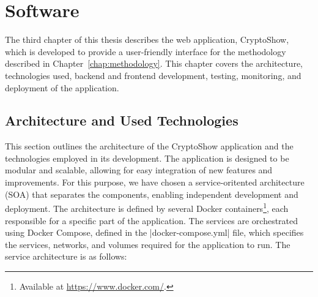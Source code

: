 \chapter{Software}
\label{chap:software}

The third chapter of this thesis describes the web application, CryptoShow, which is developed to provide a user-friendly interface for the methodology described in Chapter~\ref{chap:methodology}. This chapter covers the architecture, technologies used, backend and frontend development, testing, monitoring, and deployment of the application.

\section{Architecture and Used Technologies}
\label{sec:architecture-technologies}

This section outlines the architecture of the CryptoShow application and the technologies employed in its development. The application is designed to be modular and scalable, allowing for easy integration of new features and improvements. For this purpose, we have chosen a service-oritented architecture (SOA) that separates the components, enabling independent development and deployment. The architecture is defined by several Docker containers\footnote{Available at \url{https://www.docker.com/}.}, each responsible for a specific part of the application. The services are orchestrated using Docker Compose, defined in the \inline|docker-compose.yml| file, which specifies the services, networks, and volumes required for the application to run. The service architecture is as follows:


